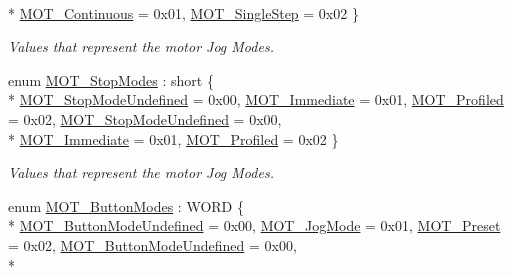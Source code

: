 \begin{DoxyCompactItemize}
\\*
\hyperlink{group___common_gga009eac484778f2873f249c8562d94a93ad2fb6219129282462f7f204c5af85b19}{M\+O\+T\+\_\+\+Continuous} = 0x01, 
\hyperlink{group___common_gga009eac484778f2873f249c8562d94a93a48cd563aa46a46ac784f7b13be3be86c}{M\+O\+T\+\_\+\+Single\+Step} = 0x02
 \}\begin{DoxyCompactList}\small\item\em Values that represent the motor Jog Modes. \end{DoxyCompactList}
\item 
enum \hyperlink{group___common_ga4b1f06d8365231862a18380e278c3c44}{M\+O\+T\+\_\+\+Stop\+Modes} \+: short \{ \\*
\hyperlink{group___common_gga4b1f06d8365231862a18380e278c3c44ae86cc830a5ce5688dc85d33fb72141e6}{M\+O\+T\+\_\+\+Stop\+Mode\+Undefined} = 0x00, 
\hyperlink{group___common_gga4b1f06d8365231862a18380e278c3c44a545150bdde54a8f8ea55039c71b01033}{M\+O\+T\+\_\+\+Immediate} = 0x01, 
\hyperlink{group___common_gga4b1f06d8365231862a18380e278c3c44a5582c0ca48da63a0de82e2403415ddf3}{M\+O\+T\+\_\+\+Profiled} = 0x02, 
\hyperlink{group___common_gga4b1f06d8365231862a18380e278c3c44ae86cc830a5ce5688dc85d33fb72141e6}{M\+O\+T\+\_\+\+Stop\+Mode\+Undefined} = 0x00, 
\\*
\hyperlink{group___common_gga4b1f06d8365231862a18380e278c3c44a545150bdde54a8f8ea55039c71b01033}{M\+O\+T\+\_\+\+Immediate} = 0x01, 
\hyperlink{group___common_gga4b1f06d8365231862a18380e278c3c44a5582c0ca48da63a0de82e2403415ddf3}{M\+O\+T\+\_\+\+Profiled} = 0x02
 \}\begin{DoxyCompactList}\small\item\em Values that represent the motor Jog Modes. \end{DoxyCompactList}
\item 
enum \hyperlink{group___common_ga7cccb4c592f8aa2f869b5cd9f0b0e7f9}{M\+O\+T\+\_\+\+Button\+Modes} \+: W\+O\+RD \{ \\*
\hyperlink{group___common_gga7cccb4c592f8aa2f869b5cd9f0b0e7f9a31e6b371600db08005cbf355d41e7f03}{M\+O\+T\+\_\+\+Button\+Mode\+Undefined} = 0x00, 
\hyperlink{group___common_gga7cccb4c592f8aa2f869b5cd9f0b0e7f9ab71d573463b20821e5b42cf523c512be}{M\+O\+T\+\_\+\+Jog\+Mode} = 0x01, 
\hyperlink{group___common_gga7cccb4c592f8aa2f869b5cd9f0b0e7f9ac7c903649c2421d63f2def21b0fe2043}{M\+O\+T\+\_\+\+Preset} = 0x02, 
\hyperlink{group___common_gga7cccb4c592f8aa2f869b5cd9f0b0e7f9a31e6b371600db08005cbf355d41e7f03}{M\+O\+T\+\_\+\+Button\+Mode\+Undefined} = 0x00, 
\\*

\end{DoxyCompactItemize}
